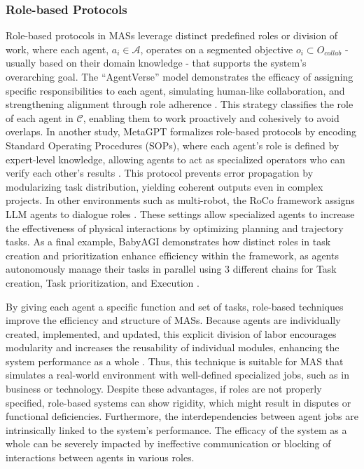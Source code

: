 \documentclass[acmsmall,nonacm]{acmart}
\begin{document}
        \subsubsection{Role-based Protocols}
        Role-based protocols in MASs leverage distinct predefined roles or division of work, where each agent, $a_i \in \mathcal{A}$, operates on a segmented objective $o_i \subset O_{collab}$ - usually based on their domain knowledge - that supports the system's overarching goal. The ``AgentVerse'' model demonstrates the efficacy of assigning specific responsibilities to each agent, simulating human-like collaboration, and strengthening alignment through role adherence \cite{chen2024agentverse}. This strategy classifies the role of each agent in $\mathcal{C}$, enabling them to work proactively and cohesively to avoid overlaps. In another study, MetaGPT formalizes role-based protocols by encoding Standard Operating Procedures (SOPs), where each agent’s role is defined by expert-level knowledge, allowing agents to act as specialized operators who can verify each other's results \cite{hong2024metagpt}. This protocol prevents error propagation by modularizing task distribution, yielding coherent outputs even in complex projects.
        In other environments such as multi-robot, the RoCo framework assigns LLM agents to dialogue roles  \cite{mandi2024roco}. These settings allow specialized agents to increase the effectiveness of physical interactions by optimizing planning and trajectory tasks.  As a final example, BabyAGI demonstrates how distinct roles in task creation and prioritization enhance efficiency within the framework, as agents autonomously manage their tasks in parallel using 3 different chains for Task creation, Task prioritization, and Execution \cite{talebirad2023multiagentcollaborationharnessingpower}.

        By giving each agent a specific function and set of tasks, role-based techniques improve the efficiency and structure of MASs. Because agents are individually created, implemented, and updated, this explicit division of labor encourages modularity and increases the reusability of individual modules, enhancing the system performance as a whole \cite{hong2024metagpt}. Thus, this technique is suitable for MAS that simulates a real-world environment with well-defined specialized jobs, such as in business or technology. Despite these advantages, if roles are not properly specified, role-based systems can show rigidity, which might result in disputes or functional deficiencies. Furthermore, the interdependencies between agent jobs are intrinsically linked to the system's performance. The efficacy of the system as a whole can be severely impacted by ineffective communication or blocking of interactions between agents in various roles. 
\end{document}
